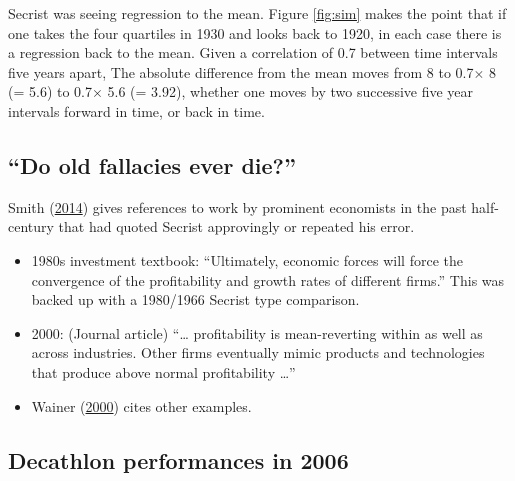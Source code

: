 \documentclass[
  10pt,
  b5paper]{book}
\providecommand{\tightlist}{%
  \setlength{\itemsep}{0pt}\setlength{\parskip}{0pt}}
\begin{document}
Secrist was seeing regression to the mean. Figure \ref{fig:sim} makes the point that if one takes the four quartiles in 1930 and looks back to 1920, in each case there is a regression back to the mean. Given a correlation of 0.7 between time intervals five years apart, The absolute difference from the mean moves from 8 to 0.7\(\times\) 8 (= 5.6) to 0.7\(\times\) 5.6 (= 3.92), whether one moves by two successive five year intervals forward in time, or back in time.

\hypertarget{do-old-fallacies-ever-die}{%
\subsection*{``Do old fallacies ever die?''}\label{do-old-fallacies-ever-die}}

Smith (\protect\hyperlink{ref-smith-sd}{2014}) gives references to work by prominent economists in the past half-century that had quoted Secrist approvingly or repeated his error.

\begin{itemize}
\tightlist
\item
  1980s investment textbook: ``Ultimately, economic forces will force the convergence of the profitability and growth rates of different firms.'' This was backed up with a 1980/1966 Secrist type comparison.
\item
  2000: (Journal article) ``\ldots{} profitability is mean-reverting within as well as across industries. Other firms eventually mimic products and technologies that produce above normal profitability \ldots{}''
\item
  Wainer (\protect\hyperlink{ref-wainerRegress}{2000}) cites other examples.
\end{itemize}

\hypertarget{decathlon-performances-in-2006}{%
\subsection*{Decathlon performances in 2006}\label{decathlon-performances-in-2006}}
\end{document}
